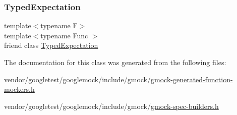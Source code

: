 \mbox{\label{classtesting_1_1internal_1_1_function_mocker_base_a4f17de55396a8ef740d5ad2b1380a851}} 
\subsubsection{\texorpdfstring{Typed\+Expectation}{TypedExpectation}}
{\footnotesize\ttfamily template$<$typename F$>$ \\
template$<$typename Func $>$ \\
friend class \hyperlink{classtesting_1_1internal_1_1_typed_expectation}{Typed\+Expectation}\hspace{0.3cm}{\ttfamily [friend]}}



The documentation for this class was generated from the following files\+:\begin{DoxyCompactItemize}
\item 
vendor/googletest/googlemock/include/gmock/\hyperlink{gmock-generated-function-mockers_8h}{gmock-\/generated-\/function-\/mockers.\+h}\item 
vendor/googletest/googlemock/include/gmock/\hyperlink{gmock-spec-builders_8h}{gmock-\/spec-\/builders.\+h}\end{DoxyCompactItemize}
